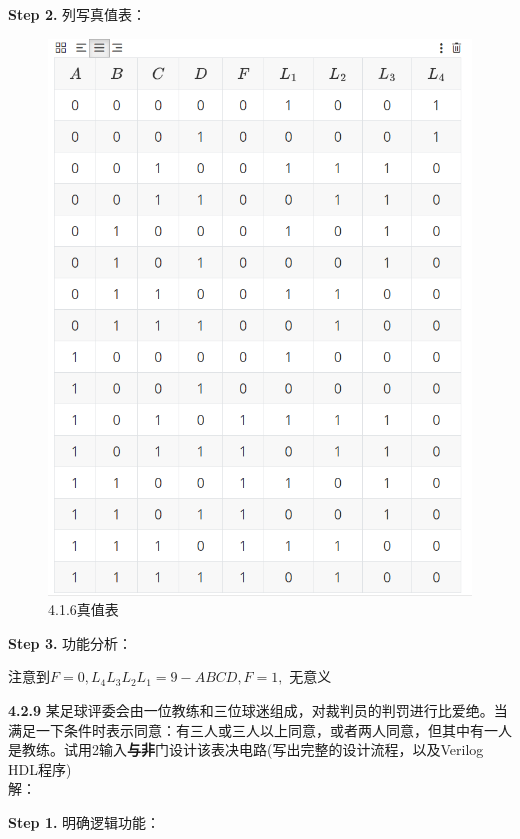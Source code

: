 \documentclass[a4paper,11pt,UTF8]{article}
\begin{document}
\textbf{Step 2.} 列写真值表：
\begin{figure}[H]
	\centering
	\includegraphics[scale=0.29]{SD4.1.6_1}
	\caption{4.1.6真值表}
\end{figure}
\textbf{Step 3.} 功能分析：
 
注意到$F=0,L_4L_3L_2L_1=9-ABCD,F=1,$ 无意义

\textbf{4.2.9} 某足球评委会由一位教练和三位球迷组成，对裁判员的判罚进行比爱绝。当满足一下条件时表示同意：有三人或三人以上同意，或者两人同意，但其中有一人是教练。试用2输入\textbf{与非}门设计该表决电路(写出完整的设计流程，以及Verilog HDL程序)\\
解：

\textbf{Step 1.} 明确逻辑功能：
\end{document}
